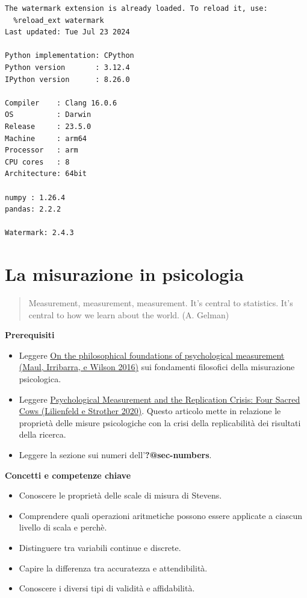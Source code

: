 \documentclass[
  letterpaper,
  krantz2]{{[}./krantz{]}}
\providecommand{\tightlist}{%
  \setlength{\itemsep}{0pt}\setlength{\parskip}{0pt}}\usepackage{longtable,booktabs,array}
\begin{document}
\begin{verbatim}
The watermark extension is already loaded. To reload it, use:
  %reload_ext watermark
Last updated: Tue Jul 23 2024

Python implementation: CPython
Python version       : 3.12.4
IPython version      : 8.26.0

Compiler    : Clang 16.0.6 
OS          : Darwin
Release     : 23.5.0
Machine     : arm64
Processor   : arm
CPU cores   : 8
Architecture: 64bit

numpy : 1.26.4
pandas: 2.2.2

Watermark: 2.4.3
\end{verbatim}

\chapter{La misurazione in psicologia}\label{sec-measurement}

\begin{quote}
Measurement, measurement, measurement. It's central to statistics. It's
central to how we learn about the world. (A. Gelman)
\end{quote}

\textbf{Prerequisiti}

\begin{itemize}
\tightlist
\item
  Leggere
  \href{https://www.sciencedirect.com/science/article/pii/S0263224115005801?casa_token=QTLWp2GIWswAAAAA:wmewUxxK68plnyJhu51VMpVSnI4rB5wB36p4l1KlKarbFwhFTuIWUS7V5ZHdfhoqSqiy4JJoqg}{On
  the philosophical foundations of psychological measurement (Maul,
  Irribarra, e Wilson 2016)} sui fondamenti filosofici della misurazione
  psicologica.
\item
  Leggere
  \href{https://web.p.ebscohost.com/ehost/pdfviewer/pdfviewer?vid=0&sid=52940ed5-6696-4f73-be23-b5f868703f25\%40redis}{Psychological
  Measurement and the Replication Crisis: Four Sacred Cows (Lilienfeld e
  Strother 2020)}. Questo articolo mette in relazione le proprietà delle
  misure psicologiche con la crisi della replicabilità dei risultati
  della ricerca.
\item
  Leggere la sezione sui numeri dell'\textbf{?@sec-numbers}.
\end{itemize}

\textbf{Concetti e competenze chiave}

\begin{itemize}
\tightlist
\item
  Conoscere le proprietà delle scale di misura di Stevens.
\item
  Comprendere quali operazioni aritmetiche possono essere applicate a
  ciascun livello di scala e perchè.
\item
  Distinguere tra variabili continue e discrete.
\item
  Capire la differenza tra accuratezza e attendibilità.
\item
  Conoscere i diversi tipi di validità e affidabilità.
\end{itemize}
\end{document}
